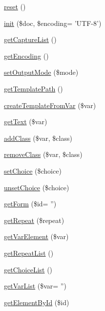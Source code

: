 \begin{DoxyCompactItemize}
\item 
\hyperlink{classDom_1_1Template_a8ddda8288ae584f6632875401e726138}{reset} ()
\item 
\hyperlink{classDom_1_1Template_a8f29aebfb2e4db80479efec819d2e1d1}{init} (\$doc, \$encoding= 'U\+T\+F-\/8')
\item 
\hyperlink{classDom_1_1Template_a40b3174aa19ca7c8765eadc3c864caf9}{get\+Capture\+List} ()
\item 
\hyperlink{classDom_1_1Template_a73227b18446fa480c5b9e41a9702456c}{get\+Encoding} ()
\item 
\hyperlink{classDom_1_1Template_af4dd061be5d24a1283da0895d006d1ed}{set\+Output\+Mode} (\$mode)
\item 
\hyperlink{classDom_1_1Template_ac7fbeb863408df7db41e82a266fad720}{get\+Template\+Path} ()
\item 
\hyperlink{classDom_1_1Template_a2a52981c6caaec6421c374a68b35bbb8}{create\+Template\+From\+Var} (\$var)
\item 
\hyperlink{classDom_1_1Template_a527d88fb0f624d574dc3b71d28a3849b}{get\+Text} (\$var)
\item 
\hyperlink{classDom_1_1Template_a66bb4b6e0aa346b4dc9b9e8c7e210688}{add\+Class} (\$var, \$class)
\item 
\hyperlink{classDom_1_1Template_a89fe5b63f8ab9f0490aa291fcc3287a4}{remove\+Class} (\$var, \$class)
\item 
\hyperlink{classDom_1_1Template_ae97ca754f7ab2552a4f46cd21664a91e}{set\+Choice} (\$choice)
\item 
\hyperlink{classDom_1_1Template_a9471f12a0bcd6090b36a3cc2a9861e84}{unset\+Choice} (\$choice)
\item 
\hyperlink{classDom_1_1Template_a14123dd5c992e8801b402a1eefebacbe}{get\+Form} (\$id= '')
\item 
\hyperlink{classDom_1_1Template_a2c98538a019a1a3d1b0e75bf2df61ee8}{get\+Repeat} (\$repeat)
\item 
\hyperlink{classDom_1_1Template_a8b4234a12fddbdb6f96b6b4457492267}{get\+Var\+Element} (\$var)
\item 
\hyperlink{classDom_1_1Template_ad757fa395e83f149db7fe9aadf895028}{get\+Repeat\+List} ()
\item 
\hyperlink{classDom_1_1Template_aab0d4e830c050a9baeda4d637c30f790}{get\+Choice\+List} ()
\item 
\hyperlink{classDom_1_1Template_a57ea1b9c0f62d5adaeed9e0bc58b4f25}{get\+Var\+List} (\$var= '')
\item 
\hyperlink{classDom_1_1Template_aa1b786cc5986264e428cf4f0b822cd44}{get\+Element\+By\+Id} (\$id)

\end{DoxyCompactItemize}
